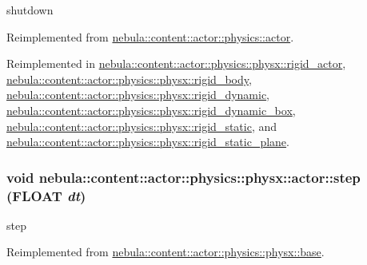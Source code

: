 shutdown 

Reimplemented from \hyperlink{classnebula_1_1content_1_1actor_1_1physics_1_1actor_ae995fe68be64a916df1bb7174cb8c7a3}{nebula::content::actor::physics::actor}.

Reimplemented in \hyperlink{classnebula_1_1content_1_1actor_1_1physics_1_1physx_1_1rigid__actor_a0a7d4d923fa08fa0ae52b798978fab3f}{nebula::content::actor::physics::physx::rigid\_\-actor}, \hyperlink{classnebula_1_1content_1_1actor_1_1physics_1_1physx_1_1rigid__body_a92e7c3f4ca5dad35ae7c656a64a18a0c}{nebula::content::actor::physics::physx::rigid\_\-body}, \hyperlink{classnebula_1_1content_1_1actor_1_1physics_1_1physx_1_1rigid__dynamic_a88a75a1eae5e774c51f6b2afd2cb70e6}{nebula::content::actor::physics::physx::rigid\_\-dynamic}, \hyperlink{classnebula_1_1content_1_1actor_1_1physics_1_1physx_1_1rigid__dynamic__box_ae9b1ab77b71317d75e61ff1d1b14e4a1}{nebula::content::actor::physics::physx::rigid\_\-dynamic\_\-box}, \hyperlink{classnebula_1_1content_1_1actor_1_1physics_1_1physx_1_1rigid__static_ae7253d0ce8bbafb563677f786d68bb2e}{nebula::content::actor::physics::physx::rigid\_\-static}, and \hyperlink{classnebula_1_1content_1_1actor_1_1physics_1_1physx_1_1rigid__static__plane_ac700d7dbdea733b24b1088cc0c78a6a6}{nebula::content::actor::physics::physx::rigid\_\-static\_\-plane}.\hypertarget{classnebula_1_1content_1_1actor_1_1physics_1_1physx_1_1actor_aaa88b4b8982018bd8d0279b063f66826}{
\subsubsection[{step}]{\setlength{\rightskip}{0pt plus 5cm}void nebula::content::actor::physics::physx::actor::step (FLOAT {\em dt})}}
\label{classnebula_1_1content_1_1actor_1_1physics_1_1physx_1_1actor_aaa88b4b8982018bd8d0279b063f66826}


step 

Reimplemented from \hyperlink{classnebula_1_1content_1_1actor_1_1physics_1_1physx_1_1base_ae14afdaa3e604b448fddb1f795d70474}{nebula::content::actor::physics::physx::base}.

